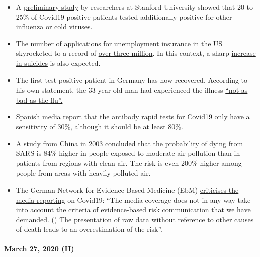 \begin{itemize}
\tightlist
\item
  A
  \href{https://medium.com/@nigam/higher-co-infection-rates-in-covid19-b24965088333}{preliminary
  study} by researchers at Stanford University showed that 20 to 25\% of
  Covid19-positive patients tested additionally positive for other
  influenza or cold viruses.
\item
  The number of applications for unemployment insurance in the US
  skyrocketed to a record of
  \href{https://www.businessinsider.com/us-weekly-jobless-claims-record-coronavirus-unemployment-insurance-labor-recession-2020-3}{over
  three million}. In this context, a sharp
  \href{https://twitter.com/KoenSwinkels/status/1243066532390977544}{increase
  in suicides} is also expected.
\item
  The first test-positive patient in Germany has now recovered.
  According to his own statement, the 33-year-old man had experienced
  the illness
  \href{https://www.br.de/nachrichten/bayern/coronavirus-patient-nummer-1-wie-ich-die-quarantaene-erlebte,Rrm4Ul8}{``not
  as bad as the flu''.}
\item
  Spanish media
  \href{https://elpais.com/sociedad/2020-03-25/los-test-rapidos-de-coronavirus-comprados-en-china-no-funcionan.html}{report}
  that the antibody rapid tests for Covid19 only have a sensitivity of
  30\%, although it should be at least 80\%.
\item
  A
  \href{https://ehjournal.biomedcentral.com/articles/10.1186/1476-069X-2-15}{study
  from China in 2003} concluded that the probability of dying from SARS
  is 84\% higher in people exposed to moderate air pollution than in
  patients from regions with clean air. The risk is even 200\% higher
  among people from areas with heavily polluted air.
\item
  The German Network for Evidence-Based Medicine (EbM)
  \href{https://www.ebm-netzwerk.de/en/publications/covid-19}{criticises
  the media reporting} on Covid19: ``The media coverage does not in any
  way take into account the criteria of evidence-based risk
  communication that we have demanded. () The presentation of raw data
  without reference to other causes of death leads to an overestimation
  of the risk''.
\end{itemize}

\hypertarget{march-27-2020-ii}{%
\paragraph{March 27, 2020 (II)}\label{march-27-2020-ii}}

